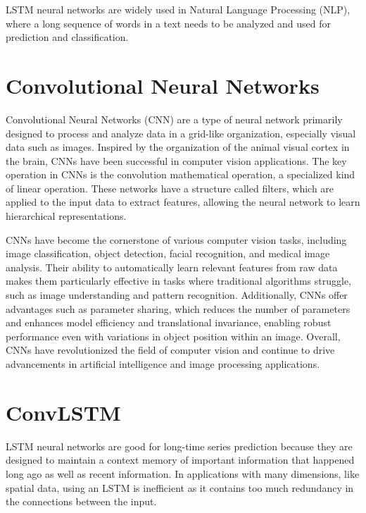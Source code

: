 LSTM neural networks are widely used in Natural Language Processing (NLP), where a long sequence of words in a text needs to be analyzed and used for prediction and classification.

\section{Convolutional Neural Networks}
\label{sec:CNN}

Convolutional Neural Networks (CNN) are a type of neural network primarily designed to process and analyze data in a grid-like organization, especially visual data such as images. Inspired by the organization of the animal visual cortex in the brain, CNNs have been successful in computer vision applications. The key operation in CNNs is the convolution mathematical operation, a specialized kind of linear operation. These networks have a structure called filters, which are applied to the input data to extract features, allowing the neural network to learn hierarchical representations.

CNNs have become the cornerstone of various computer vision tasks, including image classification, object detection, facial recognition, and medical image analysis. Their ability to automatically learn relevant features from raw data makes them particularly effective in tasks where traditional algorithms struggle, such as image understanding and pattern recognition. Additionally, CNNs offer advantages such as parameter sharing, which reduces the number of parameters and enhances model efficiency and translational invariance, enabling robust performance even with variations in object position within an image. Overall, CNNs have revolutionized the field of computer vision and continue to drive advancements in artificial intelligence and image processing applications.

\section{ConvLSTM}
\label{sec:ConvLSTM} 

LSTM neural networks are good for long-time series prediction because they are designed to maintain a context memory of important information that happened long ago as well as recent information. In applications with many dimensions, like spatial data, using an LSTM is inefficient as it contains too much redundancy in the connections between the input. 

